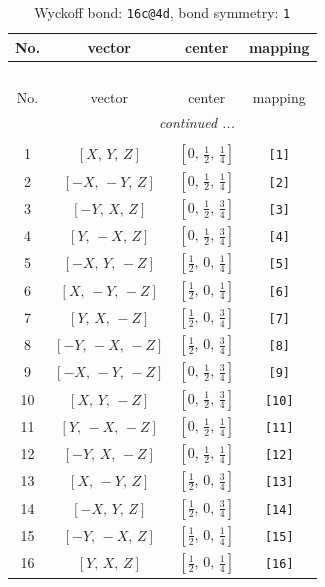 \documentclass[fleqn,8pt]{jsarticle}
\begin{document}
\begin{longtable}{cccc}
\caption{Wyckoff bond: {\tt 16c@4d}, bond symmetry: {\tt 1}}
 \\
 \hline \hline
No. & vector & center & mapping \\ \hline \endfirsthead

\multicolumn{3}{l}{\tablename\ \thetable{}} \\
 \hline \hline
No. & vector & center & mapping \\ \hline \endhead

 \hline \hline
\multicolumn{3}{r}{\footnotesize\it continued ...} \\ \endfoot

 \hline \hline
\multicolumn{3}{r}{} \\ \endlastfoot

1 & $\left[ X,\, Y,\, Z \right]$ & $\left[ 0,\, \frac{1}{2},\, \frac{1}{4} \right]$ & {\tt [1]} \\ \hline
2 & $\left[ - X,\, - Y,\, Z \right]$ & $\left[ 0,\, \frac{1}{2},\, \frac{1}{4} \right]$ & {\tt [2]} \\ \hline
3 & $\left[ - Y,\, X,\, Z \right]$ & $\left[ 0,\, \frac{1}{2},\, \frac{3}{4} \right]$ & {\tt [3]} \\ \hline
4 & $\left[ Y,\, - X,\, Z \right]$ & $\left[ 0,\, \frac{1}{2},\, \frac{3}{4} \right]$ & {\tt [4]} \\ \hline
5 & $\left[ - X,\, Y,\, - Z \right]$ & $\left[ \frac{1}{2},\, 0,\, \frac{1}{4} \right]$ & {\tt [5]} \\ \hline
6 & $\left[ X,\, - Y,\, - Z \right]$ & $\left[ \frac{1}{2},\, 0,\, \frac{1}{4} \right]$ & {\tt [6]} \\ \hline
7 & $\left[ Y,\, X,\, - Z \right]$ & $\left[ \frac{1}{2},\, 0,\, \frac{3}{4} \right]$ & {\tt [7]} \\ \hline
8 & $\left[ - Y,\, - X,\, - Z \right]$ & $\left[ \frac{1}{2},\, 0,\, \frac{3}{4} \right]$ & {\tt [8]} \\ \hline
9 & $\left[ - X,\, - Y,\, - Z \right]$ & $\left[ 0,\, \frac{1}{2},\, \frac{3}{4} \right]$ & {\tt [9]} \\ \hline
10 & $\left[ X,\, Y,\, - Z \right]$ & $\left[ 0,\, \frac{1}{2},\, \frac{3}{4} \right]$ & {\tt [10]} \\ \hline
11 & $\left[ Y,\, - X,\, - Z \right]$ & $\left[ 0,\, \frac{1}{2},\, \frac{1}{4} \right]$ & {\tt [11]} \\ \hline
12 & $\left[ - Y,\, X,\, - Z \right]$ & $\left[ 0,\, \frac{1}{2},\, \frac{1}{4} \right]$ & {\tt [12]} \\ \hline
13 & $\left[ X,\, - Y,\, Z \right]$ & $\left[ \frac{1}{2},\, 0,\, \frac{3}{4} \right]$ & {\tt [13]} \\ \hline
14 & $\left[ - X,\, Y,\, Z \right]$ & $\left[ \frac{1}{2},\, 0,\, \frac{3}{4} \right]$ & {\tt [14]} \\ \hline
15 & $\left[ - Y,\, - X,\, Z \right]$ & $\left[ \frac{1}{2},\, 0,\, \frac{1}{4} \right]$ & {\tt [15]} \\ \hline
16 & $\left[ Y,\, X,\, Z \right]$ & $\left[ \frac{1}{2},\, 0,\, \frac{1}{4} \right]$ & {\tt [16]} \\
\end{longtable}
\end{document}
